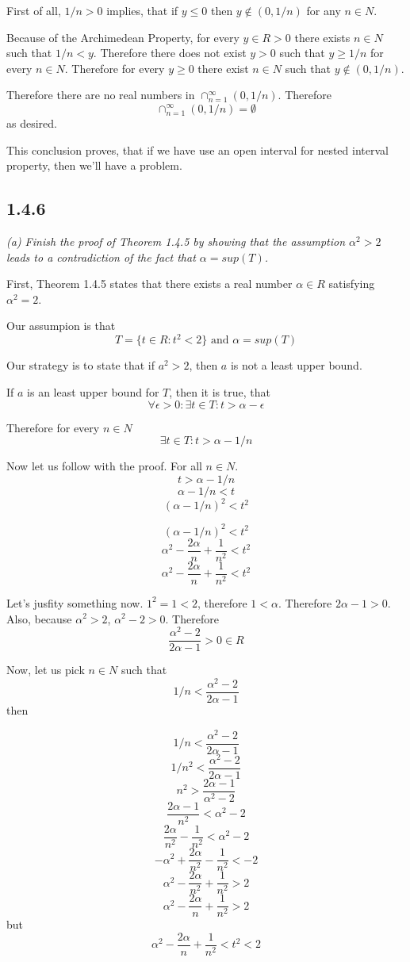\documentclass[11pt,oneside,titlepage]{book}
\begin{document}
First of all, $1/n > 0$ implies, that if $y \leq 0$ then $y \notin (0, 1/n)$
for any $n \in N$.

Because of the Archimedean Property, for every $y \in R > 0$ there exists
$n \in N$ such that $1/n < y$. Therefore there does not exist $y > 0$ such
that $y \geq 1/n$ for every $n \in N$. Therefore for every $y \geq 0$ there
exist $n \in N$ such that $y \notin (0, 1/n)$.

Therefore there are no real
numbers in $\cap^{\infty}_{n = 1}(0, 1/n)$. Therefore 
$$\cap^{\infty}_{n = 1}(0, 1/n) = \emptyset$$
as desired.

This conclusion proves, that if we have use an open interval for nested
interval property, then we'll have a problem.

\subsection*{1.4.6}
\textit{(a) Finish the proof of Theorem 1.4.5 by showing that the assumption
  $\alpha ^ 2 > 2$ leads to a contradiction of the fact that
  $\alpha = sup(T)$.}

First, Theorem 1.4.5 states that there exists a real number $\alpha \in R$
satisfying $\alpha ^ 2 = 2$.

Our assumpion is that
$$T = \{t \in R: t ^ 2 < 2\}\text{ and }\alpha = sup(T)$$

Our strategy is to state that if $a^2 > 2$, then $a$ is not a least upper
bound.

If $a$ is an least upper bound for $T$, then it is true, that
$$\forall \epsilon > 0: \exists t \in T: t > \alpha - \epsilon $$

Therefore for every $n \in N$
$$\exists t \in T: t > \alpha - 1/n $$

Now let us follow with the proof. For all $n \in N$.
$$t > \alpha - 1/n $$
$$\alpha - 1/n < t $$
$$(\alpha - 1/n)^2 < t^2 $$

$$(\alpha - 1/n)^2 < t^2 $$
$$\alpha^2 - \frac{2 \alpha}{n} + \frac{1}{n^2} < t^2 $$
$$\alpha^2 - \frac{2 \alpha}{n} + \frac{1}{n^2} < t^2 $$

Let's jusfity something now. $1^2 = 1 < 2$, therefore $1 < \alpha$. Therefore
$2 \alpha - 1 > 0$. Also, because $\alpha^2 > 2$, $\alpha^2 - 2 > 0$.
Therefore 
$$\frac{\alpha^2 - 2}{2 \alpha -  1} > 0 \in R$$

Now, let us pick $n \in N$ such that
$$1/n < \frac{\alpha^2 - 2}{2 \alpha -  1}$$
then

$$1/n < \frac{\alpha^2 - 2}{2 \alpha -  1}$$
$$1/n^2 < \frac{\alpha^2 - 2}{2 \alpha -  1}$$
$$n^2 > \frac{2 \alpha -  1}{\alpha^2 - 2}$$
$$\frac{2 \alpha -  1}{n^2} < \alpha^2 - 2$$
$$\frac{2 \alpha}{n^2} -  \frac{1}{n^2} < \alpha^2 - 2$$
$$- \alpha^2 + \frac{2 \alpha}{n^2} -  \frac{1}{n^2} < - 2$$
$$\alpha^2 - \frac{2 \alpha}{n^2} +  \frac{1}{n^2} > 2$$
$$\alpha^2 - \frac{2 \alpha}{n} +  \frac{1}{n^2} > 2$$
but
$$\alpha^2 - \frac{2 \alpha}{n} + \frac{1}{n^2} < t^2 < 2 $$
\end{document}
